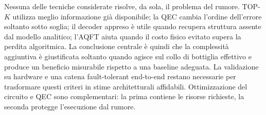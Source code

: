 Nessuna delle tecniche considerate risolve, da sola, il problema del rumore. TOP-$K$ utilizza meglio informazione già disponibile; la QEC cambia l'ordine dell'errore soltanto sotto soglia; il decoder appreso è utile quando recupera struttura assente dal modello analitico; l'AQFT aiuta quando il costo fisico evitato supera la perdita algoritmica. La conclusione centrale è quindi che la complessità aggiuntiva è giustificata soltanto quando agisce sul collo di bottiglia effettivo e produce un beneficio misurabile rispetto a una baseline adeguata. La validazione su hardware e una catena fault-tolerant end-to-end restano necessarie per trasformare questi criteri in stime architetturali affidabili. Ottimizzazione del circuito e QEC sono complementari: la prima contiene le risorse richieste, la seconda protegge l'esecuzione dal rumore.
